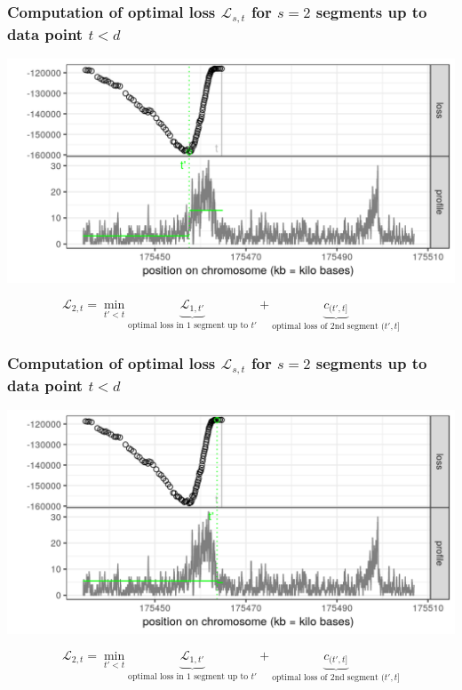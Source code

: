 \begin{frame}
\frametitle{Computation of optimal loss $\mathcal L_{s, t}$
  for $s=2$ segments up to data point $t < d$}
  \includegraphics[width=\textwidth]{figure-dp-short-3.png}

$$
\mathcal L_{2, t} =
\min_{
  t' < t
}
\underbrace{
  \mathcal L_{1, t'}
}_{
  \text{optimal loss in 1 segment up to $t'$}
}
+
\underbrace{
  c_{(t', t]}
}_{
  \text{optimal loss of 2nd segment $(t', t]$}
}
$$

\end{frame}
 
\begin{frame}
\frametitle{Computation of optimal loss $\mathcal L_{s, t}$
  for $s=2$ segments up to data point $t < d$}
  \includegraphics[width=\textwidth]{figure-dp-short-4.png}

$$
\mathcal L_{2, t} =
\min_{
  t' < t
}
\underbrace{
  \mathcal L_{1, t'}
}_{
  \text{optimal loss in 1 segment up to $t'$}
}
+
\underbrace{
  c_{(t', t]}
}_{
  \text{optimal loss of 2nd segment $(t', t]$}
}
$$

\end{frame}
